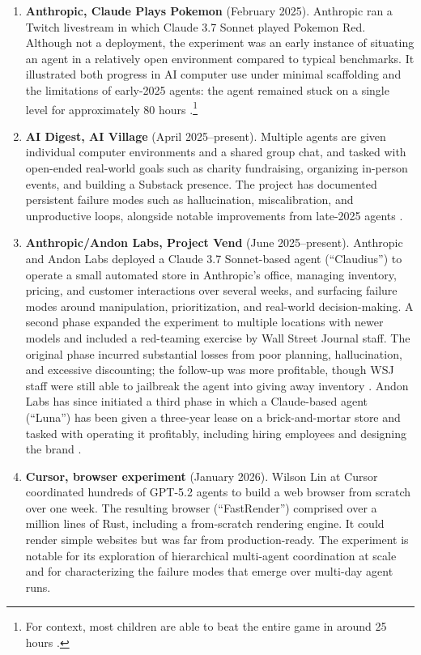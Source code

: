 \documentclass{article}
\begin{document}
\begin{enumerate}[leftmargin=16pt]
\def\labelenumi{\arabic{enumi}.}
\item \textbf{Anthropic, Claude Plays Pokemon} \citep{futurismComAdvancedAi} (February 2025). Anthropic ran a Twitch livestream in which Claude 3.7 Sonnet played Pokemon Red. Although not a deployment, the experiment was an early instance of situating an agent in a relatively open environment compared to typical benchmarks. It illustrated both progress in AI computer use under minimal scaffolding and the limitations of early-2025 agents: the agent remained stuck on a single level for approximately 80 hours \citep{futurismComAdvancedAi}.\footnote{For context, most children are able to beat the entire game in around 25 hours \citep{howlongtobeatComGame7169}.}
\item \textbf{AI Digest, AI Village} \citep{theaidigestOrgVillage} (April 2025--present). Multiple agents are given individual computer environments and a shared group chat, and tasked with open-ended real-world goals such as charity fundraising, organizing in-person events, and building a Substack presence. The project has documented persistent failure modes such as hallucination, miscalibration, and unproductive loops, alongside notable improvements from late-2025 agents \citep{theaidigestOrgBlogWhat}.
\item \textbf{Anthropic/Andon Labs, Project Vend} \citep{anthropicComResearchProject} (June 2025--present). Anthropic and Andon Labs deployed a Claude 3.7 Sonnet-based agent (``Claudius'') to operate a small automated store in Anthropic's office, managing inventory, pricing, and customer interactions over several weeks, and surfacing failure modes around manipulation, prioritization, and real-world decision-making. A second phase \citep{anthropicComResearchProject2} expanded the experiment to multiple locations with newer models and included a red-teaming exercise by Wall Street Journal staff. The original phase incurred substantial losses from poor planning, hallucination, and excessive discounting; the follow-up was more profitable, though WSJ staff were still able to jailbreak the agent into giving away inventory \citep{futurismComFutureSociety}. Andon Labs has since initiated a third phase in which a Claude-based agent (``Luna'') has been given a three-year lease on a brick-and-mortar store and tasked with operating it profitably, including hiring employees and designing the brand \citep{andonlabsComBlogAndon}.
\item \textbf{Cursor, browser experiment} \citep{cursorComBlogScaling} (January 2026). Wilson Lin at Cursor coordinated hundreds of GPT-5.2 agents to build a web browser from scratch over one week. The resulting browser (``FastRender'') comprised over a million lines of Rust, including a from-scratch rendering engine. It could render simple websites but was far from production-ready. The experiment is notable for its exploration of hierarchical multi-agent coordination at scale and for characterizing the failure modes that emerge over multi-day agent runs.

\end{enumerate}
\end{document}

